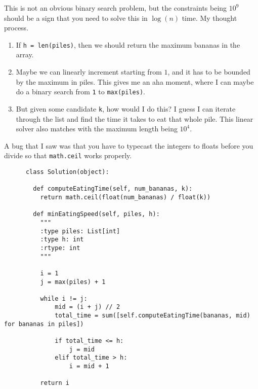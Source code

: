 \documentclass{article}
\begin{document}
  \begin{example}
    This is not an obvious binary search problem, but the constraints being $10^9$ should be a sign that you need to solve this in $\log(n)$ time. My thought process. 
    \begin{enumerate}
      \item If \texttt{h = len(piles)}, then we should return the maximum bananas in the array. 
      \item Maybe we can linearly increment starting from $1$, and it has to be bounded by the maximum in piles. This gives me an aha moment, where I can maybe do a binary search from \texttt{1} to \texttt{max(piles)}. 
      \item But given some candidate \texttt{k}, how would I do this? I guess I can iterate through the list and find the time it takes to eat that whole pile. This linear solver also matches with the maximum length being $10^4$. 
    \end{enumerate}
    A bug that I saw was that you have to typecast the integers to floats before you divide so that \texttt{math.ceil} works properly. 
    \begin{lstlisting}
      class Solution(object):

        def computeEatingTime(self, num_bananas, k): 
          return math.ceil(float(num_bananas) / float(k))

        def minEatingSpeed(self, piles, h):
          """
          :type piles: List[int]
          :type h: int
          :rtype: int
          """

          i = 1 
          j = max(piles) + 1

          while i != j: 
              mid = (i + j) // 2 
              total_time = sum([self.computeEatingTime(bananas, mid) for bananas in piles])

              if total_time <= h: 
                  j = mid
              elif total_time > h: 
                  i = mid + 1

          return i
    \end{lstlisting}
  \end{example}
\end{document}
